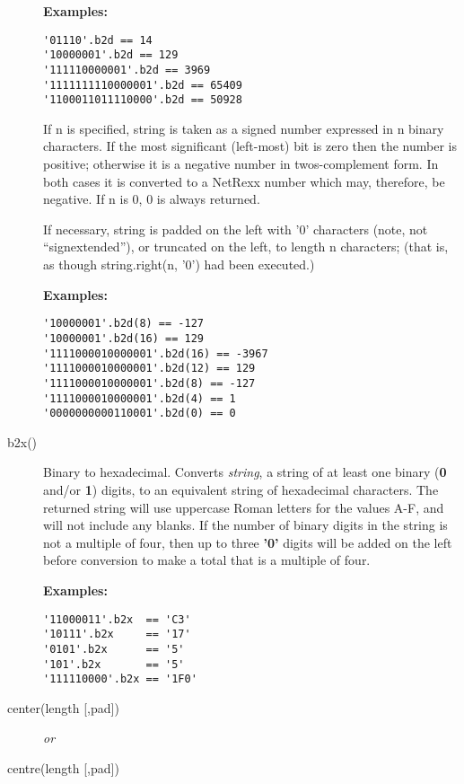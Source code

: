 \begin{description}
\textbf{Examples:}
\begin{lstlisting}
'01110'.b2d == 14 
'10000001'.b2d == 129 
'111110000001'.b2d == 3969 
'1111111110000001'.b2d == 65409 
'1100011011110000'.b2d == 50928 
\end{lstlisting}
If n is specified, string is taken as a signed number expressed in n binary characters. If the most significant (left-most) bit is zero then the number is positive; otherwise it is a negative number in twos-complement form. In both cases it is converted to a NetRexx number which may, therefore, be negative. If n is 0, 0 is always returned.

If necessary, string is padded on the left with '0' characters (note, not “signextended”), or truncated on the left, to length n characters; (that is, as though string.right(n, '0') had been executed.)

\textbf{Examples:}
\begin{lstlisting}
'10000001'.b2d(8) == -127 
'10000001'.b2d(16) == 129 
'1111000010000001'.b2d(16) == -3967 
'1111000010000001'.b2d(12) == 129 
'1111000010000001'.b2d(8) == -127 
'1111000010000001'.b2d(4) == 1 
'0000000000110001'.b2d(0) == 0
\end{lstlisting} 
\item[b2x()]\label{refb2x}
Binary to hexadecimal.
Converts \emph{string}, a string of at least one binary
(\textbf{0} and/or \textbf{1}) digits, to an equivalent string of
hexadecimal characters.
The returned string will use uppercase Roman letters for the values A-F,
and will not include any blanks.
 If the number of binary digits in the string is not a multiple of four,
then up to three \textbf{'0'} digits will be added on the left before
conversion to make a total that is a multiple of four.
 
\textbf{Examples:}
\begin{lstlisting}
'11000011'.b2x  == 'C3'
'10111'.b2x     == '17'
'0101'.b2x      == '5'
'101'.b2x       == '5'
'111110000'.b2x == '1F0'
\end{lstlisting}
  
\item[center(length [,pad{]})]\label{refcenter}

\emph{or}
\item[centre(length [,pad{]})]\label{refcentre}


\end{description}

